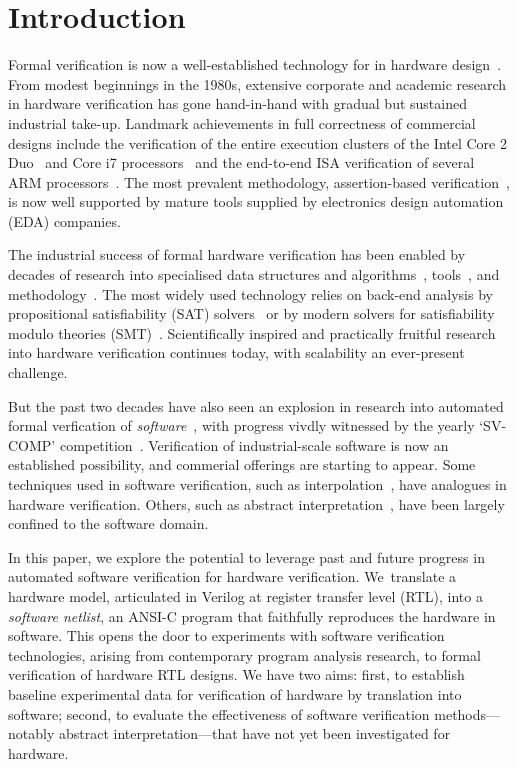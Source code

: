 \section{Introduction}\label{sec:intro}
%
Formal verification is now a well-established technology for in hardware design~\cite{Seligman:2015:FV}.  
From modest beginnings in the 1980s,
extensive corporate and academic research in hardware verification has gone
hand-in-hand with gradual but sustained industrial take-up.  Landmark
achievements in full correctness of commercial designs include the
verification of the entire execution clusters of the Intel Core 2
Duo~\cite{Core2} and Core i7 processors~\cite{i7} and the end-to-end ISA
verification of several ARM processors~\cite{ARM}.  The most prevalent
methodology, assertion-based verification~\cite{Foster:2009:AAB}, is now
well supported by mature tools supplied by electronics design automation (EDA) companies.

The industrial success of formal hardware verification has been enabled by
decades of research into specialised data structures and
algorithms~\cite{ic3, fmcad2000, ken, biere, STE},
tools~\cite{Seger:2005:IEE, abc, ebmc, vis, cadence, synopsysfv}, and
methodology~\cite{MCMILLAN2000279, Aagaard:2000:MLH, uclid, word-term,
word-bmc, DBLP:conf/lpar/AndrausLS08}.  The most widely used technology
relies on back-end analysis by propositional satisfiability (SAT)
solvers~\cite{Biere1999} or by modern solvers for satisfiability modulo
theories (SMT)~\cite{decision_procedures,
DBLP:conf/lpar/AndrausLS08,soc-keating,
DBLP:conf/mtv/SunkariCVM07,DBLP:conf/cav/Bjesse08}.  Scientifically inspired
and practically fruitful research into hardware verification continues
today, with scalability an ever-present challenge.

But the past two decades have also seen an explosion in research into
automated formal verfication of \emph{software}~\cite{dkw2008}, with
progress vivdly witnessed by the yearly `SV-COMP'
competition~\cite{Beyer2017}.  Verification of industrial-scale software is
now an established possibility, and commerial offerings are starting to
appear.  Some techniques used in software verification, such as
interpolation~\cite{Interpolants, Kroening:2011:ISV}, have analogues in
hardware verification.  Others, such as abstract
interpretation~\cite{CousotCousot77, Cousot:1996:AI}, have been largely
confined to the software domain.

In this paper, we explore the potential to leverage past and future progress
in automated software verification for hardware verification.  We~translate
a hardware model, articulated in Verilog at register transfer level (RTL),
into a \emph{software netlist}, an ANSI-C program that faithfully reproduces
the hardware in software.  This opens the door to experiments with software
verification technologies, arising from contemporary program analysis
research, to formal verification of hardware RTL designs.  We have two aims:
first, to establish baseline experimental data for verification of hardware
by translation into software; second, to evaluate the effectiveness of
software verification methods---notably abstract interpretation---that have
not yet been investigated for hardware.

